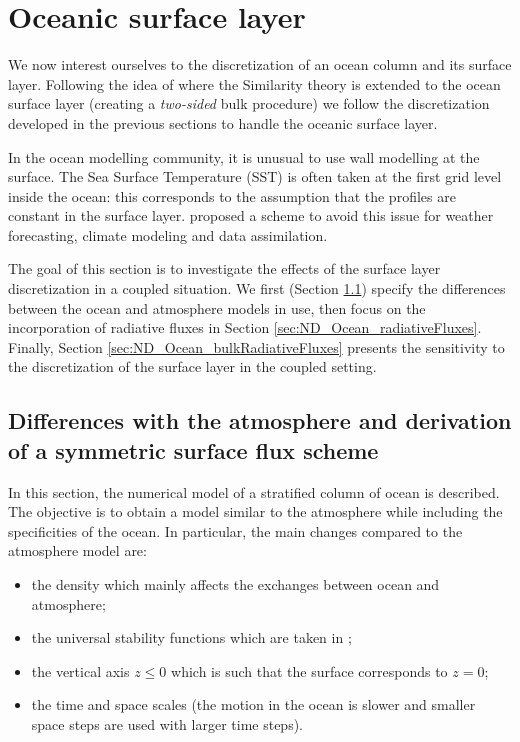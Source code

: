\section{Oceanic surface layer}
We now interest ourselves to the discretization of an ocean
column and its surface layer.
Following the idea of \citep{pelletier_two-sided_2021} where
the Similarity theory is extended to the ocean surface layer
(creating a \textit{two-sided} bulk procedure) we
follow the discretization developed in the previous sections
to handle the oceanic surface layer.
%
\par
In the ocean modelling community, it is unusual to use
wall modelling at the surface. The Sea Surface Temperature
(SST) is often taken at the first grid level inside the
ocean: this corresponds to the assumption that 
the profiles are constant in the surface layer.
\cite{zeng_prognostic_2005} proposed a scheme to avoid this
issue for weather forecasting, climate modeling and
data assimilation.
%
\par
The goal of this section is to investigate the effects
of the surface layer discretization in a coupled situation.
We first (Section \ref{sec:ND_Ocean_differencesWithAtmosphere})
specify the differences between the ocean and
atmosphere models in use,
then focus on the incorporation of radiative fluxes in
Section \ref{sec:ND_Ocean_radiativeFluxes}.
Finally, Section \ref{sec:ND_Ocean_bulkRadiativeFluxes}
presents the sensitivity to the discretization of the
surface layer in the coupled setting.
\subsection{Differences with the atmosphere and derivation of
	a symmetric surface flux scheme}
\label{sec:ND_Ocean_differencesWithAtmosphere}
In this section, the numerical model of a stratified column
of ocean is described. The objective is to obtain a model
similar to the atmosphere while including the specificities
of the ocean.
In particular, the main changes compared to the atmosphere
model are:
\begin{itemize}
	\item the density which mainly affects the exchanges
		between ocean and atmosphere;
	\item the universal stability functions which are
		taken in \cite{large_similarity_2019};
	\item the vertical axis $z \leq 0$
		which is such that the surface corresponds to $z=0$;
	\item the time and space scales (the motion in the ocean
		is slower and smaller space steps are used with
		larger time steps).
\end{itemize}
